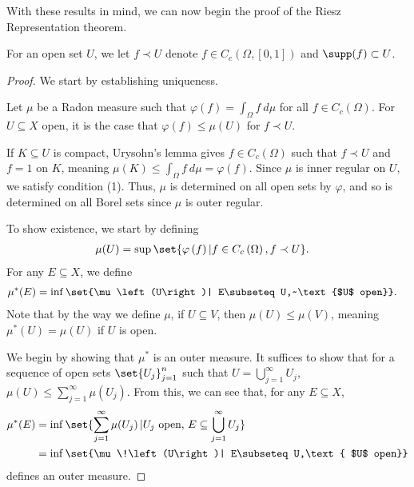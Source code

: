 \documentclass[10pt]{mypackage}
\begin{document}
With these results in mind, we can now begin the proof of the Riesz Representation theorem.
\begin{notation}
  For an open set $U$, we let $f\prec U$ denote $f\in C_c\left(\Omega,[0,1]\right)$ and $\supp(f) \subset U$.
\end{notation}
\begin{proof}
  We start by establishing uniqueness.\newline

  Let $\mu$ be a Radon measure such that $\varphi(f) = \int_{\Omega}f\:d\mu$ for all $f\in C_c\left(\Omega\right)$. For $U\subseteq X$ open, it is the case that $\varphi(f) \leq \mu\!\left(U\right)$ for $f\prec U$.\newline

  If $K\subseteq U$ is compact, Urysohn's lemma gives $f\in C_c\left(\Omega\right)$ such that $f\prec U$ and $f = 1$ on $K$, meaning $\mu\!\left(K\right) \leq \int_{\Omega}f\:d\mu = \varphi(f)$. Since $\mu$ is inner regular on $U$, we satisfy condition (1). Thus, $\mu$ is determined on all open sets by $\varphi$, and so is determined on all Borel sets since $\mu$ is outer regular.\newline

  To show existence, we start by defining
  \begin{align*}
    \mu\!\left(U\right) &=\sup\set{\varphi\left(f\right)| f\in C_c\left(\Omega\right),f\prec U}.
  \end{align*}
  For any $E\subseteq X$, we define
  \begin{align*}
    \mu^{\ast}\!\left(E\right) &= \inf\set{\mu\left(U\right)| E\subseteq U,~\text{$U$ open}}.
  \end{align*}
  Note that by the way we define $\mu$, if $U\subseteq V$, then $\mu\!\left(U\right) \leq \mu\!\left(V\right)$, meaning $\mu^{\ast}\!\left(U\right) = \mu\!\left(U\right)$ if $U$ is open.\newline

  We begin by showing that $\mu^{\ast}$ is an outer measure. It suffices to show that for a sequence of open sets $\set{U_j}_{j=1}^{n}$ such that $U = \bigcup_{j=1}^{\infty}U_j$, $\mu\!\left(U\right) \leq \sum_{j=1}^{\infty}\mu\!\left(U_j\right)$. From this, we can see that, for any $E\subseteq X$,
  \begin{align*}
    \mu^{\ast}\!\left(E\right) &= \inf\set{\sum_{j=1}^{\infty}\mu\!\left(U_j\right)| U_j\text{ open, }E\subseteq \bigcup_{j=1}^{\infty}U_j}\\
                               &= \inf\set{\mu\!\left(U\right)| E\subseteq U,\text{ $U$ open}}
  \end{align*}
  defines an outer measure.\newline


\end{proof}
\end{document}
